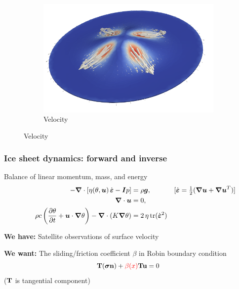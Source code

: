 \documentclass[10pt,final,xcolor=dvipsnames]{beamer}
\newcommand{\gbf}[1]{\boldsymbol{#1}}
\newcommand{\bs}[1]{\ensuremath{\boldsymbol{#1}}}
\newcommand{\edot}{\dot{\gbf{\varepsilon}}}
\newcommand{\tcr}[1]{\ensuremath{\textcolor{red}{{#1}}}}
\begin{document}
\begin{frame}
\begin{figure}
		\begin{subfigure}[b]{0.49\textwidth}
			\centering
			\includegraphics[scale=0.35]{velocitySideView2.png}
			\caption{Velocity}
		\end{subfigure}
	\end{figure}
\end{frame}


\begin{frame}
\frametitle{Ice sheet dynamics: forward and inverse}

\begin{block}{Balance of linear momentum, mass, and energy}
  \[
  \begin{aligned}
    - \gbf{\nabla} \cdot \left[ \eta(\theta,\gbf{u}) \, \edot
      -\gbf{I}p \right] &= \rho \gbf{g},
    &[\edot = \tfrac 12  (\gbf{\nabla u} + \gbf{\nabla  u}^T)]
    \hspace{-2em}
    \\
    \gbf{\nabla} \cdot \gbf{u} &= 0,
    \vspace{-2em} \\
    \rho c \left(\frac{\partial \theta}{\partial t} + \gbf{u} \cdot \gbf{\nabla}
    \theta\right)  - \gbf{\nabla} \cdot (K \gbf{\nabla} \theta)
    &= 2 \, \eta \, \mathrm{tr}(\edot^2)
  \end{aligned}
  \]
\end{block}
\vspace{0.5cm}
\textbf{We have:} Satellite observations of surface velocity

\vspace{0.5cm}

\textbf{We want:} The sliding/friction coefficient $\beta$ in
Robin boundary condition
\begin{equation*}
{\bf T}(\bs \sigma {\bf n}) + \tcr{\beta (x)}{\bf T}{\bf u} = 0
\end{equation*}
($\bf T$ is tangential component)

\end{frame}
\end{document}
